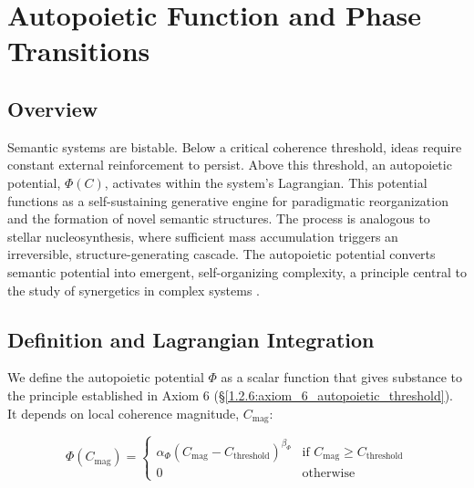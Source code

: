 \chapter{Autopoietic Function and Phase Transitions}
\label{7:autopoietic_function_and_phase_transitions}


\section{Overview}
\label{7.1:overview}

Semantic systems are bistable. Below a critical coherence threshold, ideas require constant external reinforcement to persist. Above this threshold, an autopoietic potential, \(\Phi(C)\), activates within the system's Lagrangian. This potential functions as a self-sustaining generative engine for paradigmatic reorganization and the formation of novel semantic structures. The process is analogous to stellar nucleosynthesis, where sufficient mass accumulation triggers an irreversible, structure-generating cascade. The autopoietic potential converts semantic potential into emergent, self-organizing complexity, a principle central to the study of synergetics in complex systems \autocite{Haken1983}.


\section{Definition and Lagrangian Integration}
\label{7.2:definition_and_lagrangian_integration}

We define the autopoietic potential \(\Phi\) as a scalar function that gives substance to the principle established in Axiom 6 (\S\ref{1.2.6:axiom_6_autopoietic_threshold}). It depends on local coherence magnitude, \(C_{\mathrm{mag}}\):

\begin{equation}\label{eq:autopoietic_potential}
\Phi(C_{\mathrm{mag}}) =
\begin{cases}
\alpha_{\Phi} (C_{\mathrm{mag}} - C_{\text{threshold}})^{\beta_{\Phi}} & \text{if } C_{\mathrm{mag}} \geq C_{\text{threshold}} \\
0 & \text{otherwise}
\end{cases}
\end{equation}


